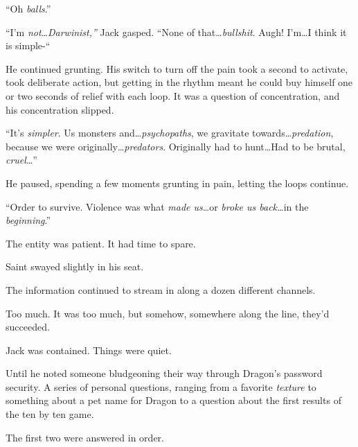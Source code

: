 ``Oh \emph{balls}.''



\sectionbreak



``I'm \emph{not}\ldots \emph{Darwinist,'' }Jack gasped.  ``None of that\ldots \emph{bullshit}.  Augh!  I'm\ldots I think it is simple-``



He continued grunting.  His switch to turn off the pain took a second to activate, took deliberate action, but getting in the rhythm meant he could buy himself one or two seconds of relief with each loop.  It was a question of concentration, and his concentration slipped.



``It's \emph{simpler}.  Us monsters and\ldots  \emph{psychopaths}, we gravitate towards\ldots \emph{predation}, because we were originally\ldots \emph{predators}.  Originally had to hunt\ldots  Had to be brutal, \emph{cruel}\ldots''



He paused, spending a few moments grunting in pain, letting the loops continue.



``Order to survive.  Violence was what \emph{made us}\ldots or\emph{ broke us back\ldots }in the\emph{ beginning}.''



The entity was patient.  It had time to spare.



\sectionbreak



Saint swayed slightly in his seat.



The information continued to stream in along a dozen different channels.



Too much.  It was too much, but somehow, somewhere along the line, they'd succeeded.



Jack was contained.  Things were quiet.



Until he noted someone bludgeoning their way through Dragon's password security.  A series of personal questions, ranging from a favorite \emph{texture }to something about a pet name for Dragon to a question about the first results of the ten by ten game.



The first two were answered in order.



